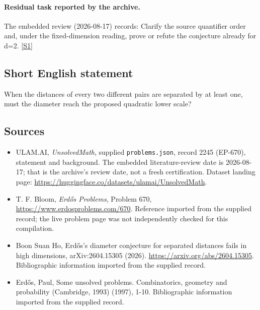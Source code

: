 \documentclass[11pt,a4paper]{article}
\newcommand{\sref}[2]{\hyperlink{source:#1:#2}{[S#2]}}
\begin{document}
\paragraph{Residual task reported by the archive.}

The embedded review (2026-08-17) records: Clarify the source quantifier order and, under the fixed-dimension reading, prove or refute the conjecture already for d=2. \sref{2245}{1}

\subsection{Short English statement}

When the distances of every two different pairs are separated by at least one, must the diameter reach the proposed quadratic lower scale?

\subsection{Sources}

{\small

\begin{itemize}

\item[\hypertarget{source:2245:1}{S1}] ULAM.AI, \emph{UnsolvedMath}, supplied \texttt{problems.json}, record 2245 (EP-670), statement and background. The embedded literature-review date is 2026-08-17; that is the archive’s review date, not a fresh certification. Dataset landing page: \url{https://huggingface.co/datasets/ulamai/UnsolvedMath}.

\item[\hypertarget{source:2245:2}{S2}] T. F. Bloom, \emph{Erdős Problems}, Problem 670, \url{https://www.erdosproblems.com/670}. Reference imported from the supplied record; the live problem page was not independently checked for this compilation.

\item[\hypertarget{source:2245:3}{S3}] Boon Suan Ho, Erdős's diameter conjecture for separated distances fails in high dimensions, arXiv:2604.15305 (2026). \url{https://arxiv.org/abs/2604.15305}. Bibliographic information imported from the supplied record.

\item[\hypertarget{source:2245:4}{S4}] Erd\H{o}s, Paul, Some unsolved problems. Combinatorics, geometry and probability (Cambridge, 1993) (1997), 1-10. Bibliographic information imported from the supplied record.

\end{itemize}

}

\label{end:2245}
\end{document}
